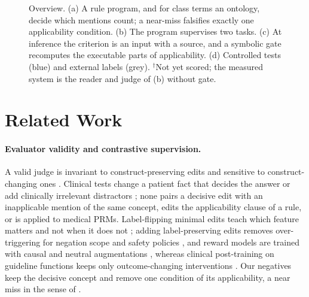 \documentclass[11pt]{article}
\newcommand{\mcv}{MedCalc-V}
\newcommand{\ns}{$^{\dagger}$}
\begin{document}
\begin{figure}[t]
{}
\caption{Overview. (a) A rule program, and for class terms an ontology,
decide which mentions count; a near-miss falsifies exactly one applicability
condition. (b) The program supervises two tasks. (c) At inference the
criterion is an input with a source, and a symbolic gate recomputes the
executable parts of applicability. (d) Controlled tests (blue) and external
labels (grey). \ns Not yet scored; the measured system is the reader and judge
of (b) without gate.}
\label{fig:overview}
\end{figure}


\section{Related Work}

\paragraph{Evaluator validity and contrastive supervision.}
A valid judge is invariant to construct-preserving edits and sensitive to
construct-changing ones \citep{chen2026judge,weng2026policy,yang2026compared}.
Clinical tests change a patient fact that decides the answer
\citep{hou2026medpic,chen2026medeinst,kim2025marc} or add clinically
irrelevant distractors \citep{vishwanath2025distracted}; none pairs a
decisive edit with an inapplicable mention of the same concept, edits the
applicability clause of a rule, or is applied to medical PRMs.
Label-flipping minimal edits \citep{kaushik2020cad,gardner2020contrast} teach
which feature matters and not when it does not \citep{joshi2022cad}; adding
label-preserving edits removes over-triggering for negation scope
\citep{she2023scone} and safety policies \citep{liu2026apt}, and reward
models are trained with causal and neutral augmentations
\citep{srivastava2026crome,liu2026dynacf}, whereas clinical post-training on
guideline functions keeps only outcome-changing interventions
\citep{shen2026medguidex}. Our negatives keep the decisive concept and
remove one condition of its applicability, a near miss in the sense of
\citet{winston1970}.
\end{document}
